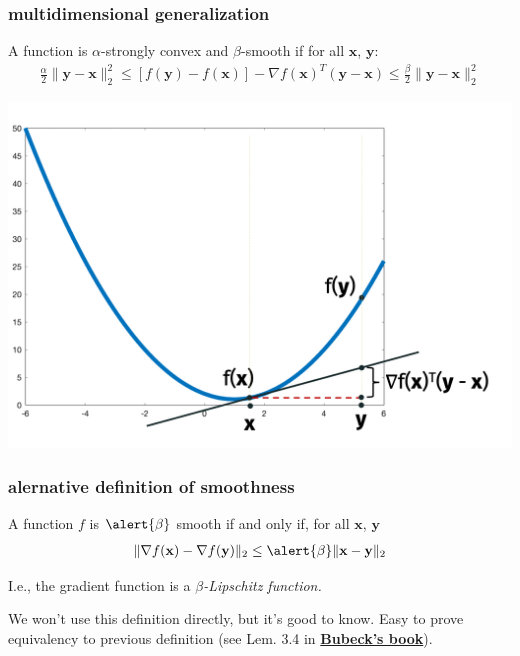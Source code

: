 \documentclass[compress]{beamer}
\newcommand{\bv}[1]{\mathbf{#1}}
\begin{document}
 \begin{frame}[t]
	\frametitle{multidimensional generalization}
	A function is \alert{ $\alpha$-strongly convex} and \alert{$\beta$-smooth} if for all $\bv{x}$, $\bv{y}$:
	\begin{align*}
		\frac{\alpha}{2}\|\bv{y} - \bv{x}\|_2^2 \leq \left[f(\bv{y}) - f(\bv{x})\right] - \nabla f(\bv{x})^T(\bv{y} - \bv{x}) \leq \frac{\beta}{2}\|\bv{y}-\bv{x}\|_2^2
	\end{align*}
\vspace{-2em}
\begin{center}
	\includegraphics[width=.75\textwidth]{smoothness_image.png}
\end{center}	
\end{frame}


\begin{frame}[t]
	\frametitle{alernative definition of smoothness}
	\begin{definition}
		A function $f$ is $\alert{\beta}$ smooth if and only if, for all $\bv{x}$, $\bv{y}$
		\begin{align*}
			\|\nabla f(\bv{x}) - \nabla f(\bv{y})\|_2 \leq \alert{\beta} \|\bv{x} - \bv{y}\|_2
		\end{align*}
	\end{definition}
	I.e., the gradient function is a \emph{$\beta$-Lipschitz function.} 
	
	We won't use this definition directly, but it's good to know. Easy to prove equivalency to previous definition (see Lem. 3.4 in \color{blue}\textbf{\href{https://arxiv.org/pdf/1405.4980.pdf}{Bubeck's book}}\color{black}).
 \end{frame}

\end{document}

